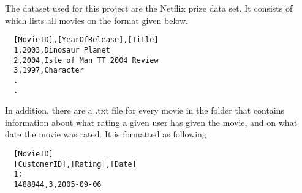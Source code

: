 The dataset used for this project are the Netflix prize data set\cite{dataset}. It consists of  which lists all movies on the format given below.
\begin{verbatim}
  [MovieID],[YearOfRelease],[Title]
  1,2003,Dinosaur Planet
  2,2004,Isle of Man TT 2004 Review
  3,1997,Character
  .
  .
\end{verbatim}
\noindent
In addition, there are a .txt file for every movie in the  folder that contains information about what rating a given user has given the movie, and on what date the movie was rated. It is formatted as following
\begin{verbatim}
  [MovieID]
  [CustomerID],[Rating],[Date]
  1:
  1488844,3,2005-09-06
\end{verbatim}
